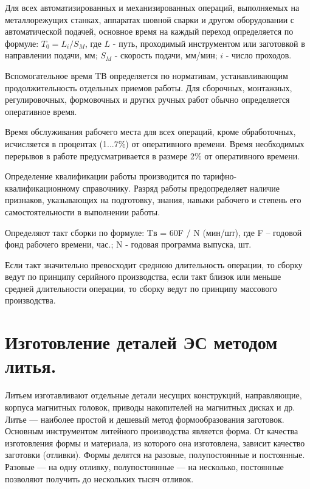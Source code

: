 \documentclass[unicode, 12pt, a4paper, oneside]{article}
\begin{document}
Для всех автоматизированных и механизированных операций, выполняемых на металлорежущих станках, аппаратах шовной сварки и другом оборудовании с автоматической подачей, основное время на каждый переход определяется по формуле: $T_0 = L_i / S_M$, где $L$ - путь, проходимый инструментом или заготовкой в направлении подачи, мм; $S_M$ - скорость подачи, мм/мин; $i$ - число проходов.

Вспомогательное время TВ определяется по нормативам, устанавливающим продолжительность отдельных приемов работы. Для сборочных, монтажных, регулировочных, формовочных и других ручных работ обычно определяется оперативное время.

Время обслуживания рабочего места для всех операций, кроме обработочных, исчисляется в процентах (1...7\%) от оперативного времени. Время необходимых перерывов в работе предусматривается в размере 2\% от оперативного времени.

Определение квалификации работы производится по тарифно-квалификационному справочнику. Разряд работы предопределяет наличие признаков, указывающих на подготовку, знания, навыки рабочего и степень его самостоятельности в выполнении работы.

Определяют такт сборки по формуле: Tв = 60F / N (мин/шт), где F – годовой фонд рабочего времени, час.; N - годовая программа выпуска, шт.

Если такт значительно превосходит среднюю длительность операции, то сборку ведут по принципу серийного производства, если такт близок или меньше средней длительности операции, то сборку ведут по принципу массового производства.


\section{Изготовление деталей ЭС методом литья.}

Литьем изготавливают отдельные детали несущих конструкций, направляющие, корпуса магнитных головок, приводы накопителей на магнитных дисках и др. Литье — наиболее простой и дешевый метод формообразования заготовок. Основным инструментом литейного производства является форма. От качества изготовления формы и материала, из которого она изготовлена, зависит качество заготовки (отливки). Формы делятся на разовые, полупостоянные и постоянные. Разовые — на одну отливку, полупостоянные — на несколько, постоянные позволяют получить до нескольких тысяч отливок.
\end{document}
